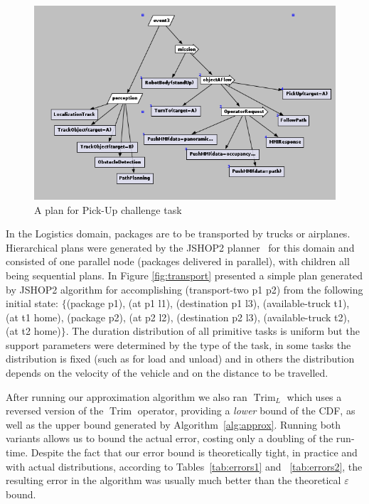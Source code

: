 \documentclass[review]{elsarticle}
\DeclareMathOperator{\Trim}{Trim}
\begin{document}
\begin{figure}
	\begin{center}
	\includegraphics[width=\textwidth]{plan31}
	\caption{A plan for Pick-Up challenge task}
	\label{fig:pickup}
	\end{center}
\end{figure}

In the Logistics domain, packages are to be transported by trucks or airplanes.
Hierarchical plans were generated by the JSHOP2 planner~\cite{nau2003shop2} for this domain and consisted of one parallel node (packages delivered in parallel),
with children all being sequential plans. In Figure {\ref{fig:transport}} presented a simple plan generated by JSHOP2 algorithm for accomplishing (transport-two p1 p2) from the following initial state: $\{$(package p1), (at p1 l1), (destination p1 l3), (available-truck t1), (at t1 home),
(package p2), (at p2 l2), (destination p2 l3), (available-truck t2), (at t2 home)$\}$.
The duration distribution of all primitive tasks is uniform but the support parameters were determined by the type of the task, 
in some tasks the distribution is fixed (such as for load and unload) and in others the distribution depends on the velocity of the vehicle
and on the distance to be travelled.

After running our approximation algorithm we also ran $\Trim_L$ which uses a reversed version of the $\Trim$ operator, providing a {\em lower} bound of the CDF, as well as the upper bound
generated by Algorithm~\ref{alg:approx}. Running both variants allows us to bound the actual error, costing
only a doubling of the run-time. Despite the fact that our error bound is theoretically tight, in practice
and with actual distributions, according to Tables~\ref{tab:errors1} and ~\ref{tab:errors2}, the resulting error
in the algorithm was usually much better than the theoretical $\varepsilon$ bound.
\end{document}
